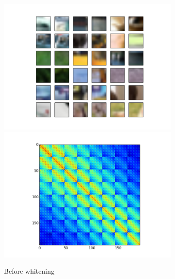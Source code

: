 \documentclass{article} %
\begin{document}
\begin{figure}
  \centering
  \begin{subfigure}[h]{0.45\columnwidth}
    \includegraphics[width=\columnwidth]{./images/patches_before_whiten.png}
    \includegraphics[width=\columnwidth]{./images/before_whiten.png}
    \caption{Before whitening}
    \label{figBefore}
  \end{subfigure}
  \hspace{0.04\columnwidth}
  \centering
  \begin{subfigure}[h]{0.45\columnwidth}

\end{subfigure}
\end{figure}
\end{document}
